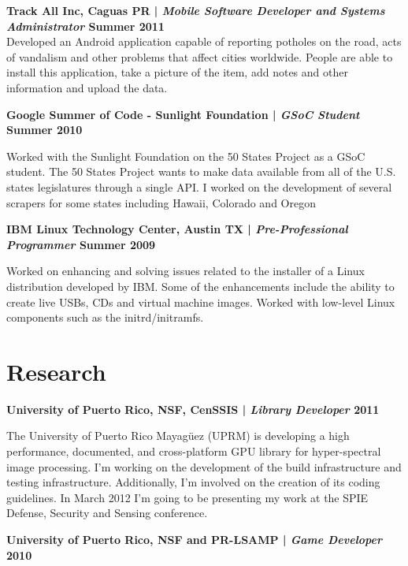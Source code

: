 \documentclass[margin,line]{res}
\begin{document}
\begin{resume}
{\bf Track All Inc, Caguas PR | {\em Mobile Software Developer and Systems Administrator} \hfill {\bf Summer 2011 \\} }
\vspace{-.01cm}
Developed an Android application capable of reporting potholes on the road, acts of vandalism and other problems that affect cities worldwide. People are able to install this application, take a picture of the item, add notes and other information and upload the data.

{\bf Google Summer of Code - Sunlight Foundation | {\em GSoC Student} \hfill {\bf Summer 2010 \\} }
\vspace{-.01cm}

Worked with the Sunlight Foundation on the 50 States Project as a GSoC student. The 50 States Project wants to make data available from all of the U.S. states legislatures through a single API. I worked on the development of several scrapers for some states including Hawaii, Colorado and Oregon 

{\bf IBM Linux Technology Center, Austin TX | {\em Pre-Professional Programmer} \hfill {\bf Summer 2009 \\} }
\vspace{-.01cm}

Worked on enhancing and solving issues related to the installer of a Linux distribution developed by IBM. Some of the enhancements include the ability to create live USBs, CDs and virtual machine images. Worked with low-level Linux components such as the initrd/initramfs. 

\section{\sc Research}

{\bf University of Puerto Rico, NSF, CenSSIS  | {\em Library Developer} \hfill {\bf 2011 \\} }
\vspace{-.01cm}

The University of Puerto Rico Mayagüez (UPRM) is developing a high performance, documented, and cross-platform GPU library for hyper-spectral image processing. I'm working on the development of the build infrastructure and testing infrastructure. Additionally, I'm involved on the creation of its coding guidelines. In March 2012 I'm going to be presenting my work at the SPIE Defense, Security and Sensing conference. 

{\bf University of Puerto Rico, NSF and PR-LSAMP | {\em Game Developer} \hfill {\bf 2010 \\} }
\vspace{-.01cm}


\end{resume}
\end{document}
